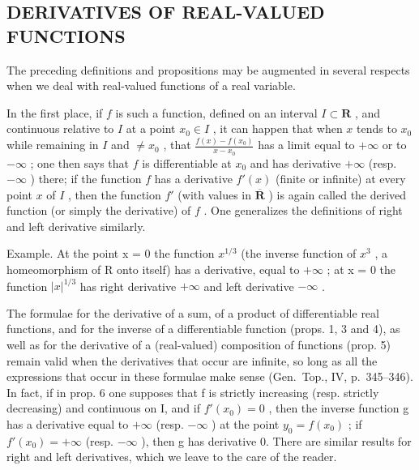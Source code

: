 \subsection{DERIVATIVES OF REAL-VALUED FUNCTIONS}

The preceding definitions and propositions may be augmented in several respects when we deal with real-valued functions of a real variable.

In the first place, if \(f\) is such a function, defined on an interval \(I \subset \mathbf{R}\) , and continuous relative to \(I\) at a point \(x_0 \in I\) , it can happen that when \(x\) tends to \(x_0\) while remaining in \(I\) and \(\neq x_0\) , that \(\frac{f(x) - f(x_0)}{x - x_0}\) has a limit equal to \(+\infty\) or to \(-\infty\) ; one then says that \(f\) is differentiable at \(x_0\) and has derivative \(+\infty\) (resp. \(-\infty\) ) there; if the function \(f\) has a derivative \(f'(x)\) (finite or infinite) at every point \(x\) of \(I\) , then the function \(f'\) (with values in \(\overline{\mathbf{R}}\) ) is again called the derived function (or simply the derivative) of \(f\) . One generalizes the definitions of right and left derivative similarly.

Example. At the point x = 0 the function \(x^{1/3}\) (the inverse function of \(x^{3}\) , a homeomorphism of R onto itself) has a derivative, equal to \(+\infty\) ; at x = 0 the function \(|x|^{1/3}\) has right derivative \(+\infty\) and left derivative \(-\infty\) .

The formulae for the derivative of a sum, of a product of differentiable real functions, and for the inverse of a differentiable function (props. 1, 3 and 4), as well as for the derivative of a (real-valued) composition of functions (prop. 5) remain valid when the derivatives that occur are infinite, so long as all the expressions that occur in these formulae make sense (Gen.~Top., IV, p.~345--346). In fact, if in prop. 6 one supposes that f is strictly increasing (resp. strictly decreasing) and continuous on I, and if \(f'(x_{0}) = 0\) , then the inverse function g has a derivative equal to \(+\infty\) (resp. \(-\infty\) ) at the point \(y_{0} = f(x_{0})\) ; if \(f'(x_{0}) = +\infty\) (resp. \(-\infty\) ), then g has derivative 0. There are similar results for right and left derivatives, which we leave to the care of the reader.

